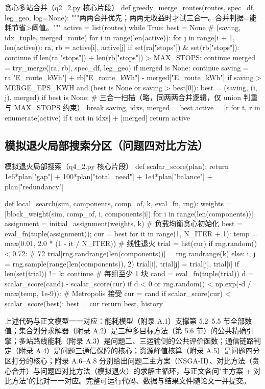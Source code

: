 \begin{Python}{贪心多站合并（q2\_2.py 核心片段）}
def greedy_merge_routes(routes, spec_df, leg_geo, log=None):
    """两两合并优先；两两无收益时才试三合一。合并判据=能耗节省>阈值。"""
    active = list(routes)
    while True:
        best = None                             # (saving, idx_tuple, merged_route)
        for i in range(len(active)):
            for j in range(i + 1, len(active)):
                ra, rb = active[i], active[j]
                if set(ra["stops"]) & set(rb["stops"]): continue
                if len(ra["stops"]) + len(rb["stops"]) > MAX_STOPS: continue
                merged = try_merge([ra, rb], spec_df, leg_geo)
                if merged is None: continue
                saving = ra["E_route_kWh"] + rb["E_route_kWh"] - merged["E_route_kWh"]
                if saving > MERGE_EPS_KWH and (best is None or saving > best[0]):
                    best = (saving, (i, j), merged)
        if best is None:
            # 三合一扫描（略，同两两合并逻辑，仅 union 判重与 MAX_STOPS 约束）
            break
        saving, idxs, merged = best
        active = [r for t, r in enumerate(active) if t not in idxs] + [merged]
    return active
\end{Python}

\subsection{模拟退火局部搜索分区（问题四对比方法）}

\begin{Python}{模拟退火局部搜索（q4\_2.py 核心片段）}
def scalar_score(plan):
    return 1e6*plan["gap"] + 100*plan["total_need"] + 1e4*plan["balance"] + plan["redundancy"]

def local_search(sim, components, comp_of, k, eval_fn, rng):
    weights = [block_weight(sim, comp_of, i, components[i]) for i in range(len(components))]
    assignment = initial_assignment(weights, k)   # 负载均衡贪心初始化
    best = eval_fn(tuple(assignment)); cur = best
    for it in range(1, N_ITER + 1):
        temp = max(0.01, 2.0 * (1 - it / N_ITER))          # 线性退火
        trial = list(cur)
        if rng.random() < 0.72:                            # 72%
            trial[rng.randrange(len(components))] = rng.randrange(k)
        else:
            i, j = rng.sample(range(len(components)), 2)
            trial[i], trial[j] = trial[j], trial[i]
        if len(set(trial)) != k: continue                  # 每组至少 1 块
        cand = eval_fn(tuple(trial))
        d = scalar_score(cand) - scalar_score(cur)
        if d < 0 or rng.random() < np.exp(-d / max(temp, 1e-9)):   # Metropolis 接受
            cur = cand
            if scalar_score(cur) < scalar_score(best): best = cur
    return best, history
\end{Python}

上述代码与正文模型一一对应：能耗模型（附录 A.1）支撑第 5.2--5.5 节全部数值；集合划分求解器（附录 A.2）是三种多目标方法（第 5.6 节）的公共精确引擎；多站路线能耗（附录 A.3）是问题二、三运输侧的公共评价函数；通信链路判定（附录 A.4）是问题三通信保障的核心；资源峰值核算（附录 A.5）是问题四分区打分的核心；附录 A.6--A.8 分别给出问题二主方案（NSGA-II）、对比方法（贪心合并）与问题四对比方法（模拟退火）的求解主循环，与正文各问"主方案 + 对比方法"的比对一一对应。完整可运行代码、数据与结果文件随论文一并提交。
